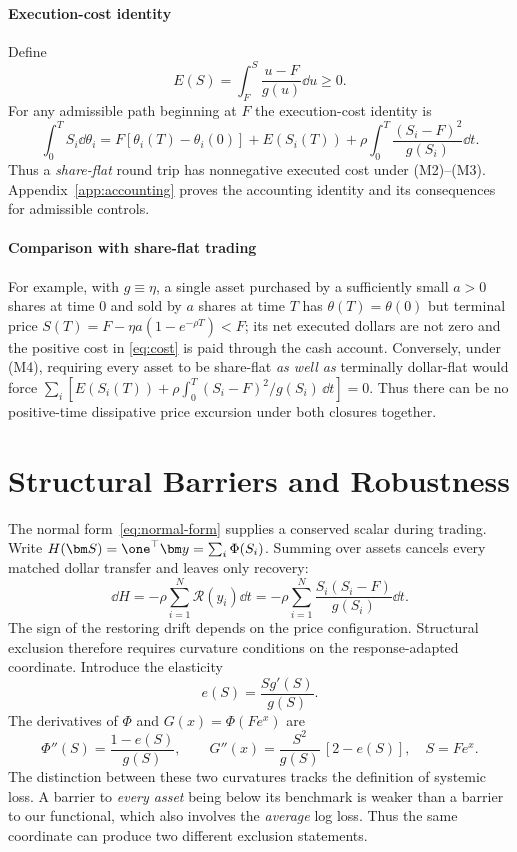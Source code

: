 \documentclass[review,hidelinks,onefignum,onetabnum]{siamonline250211}
\begin{document}
\paragraph{Execution-cost identity} Define
\begin{equation}\label{eq:E}
E(S)=\int_F^S\frac{u-F}{g(u)}\dd u\ge0.
\end{equation}
For any admissible path beginning at $F$ the execution-cost identity is
\begin{equation}\label{eq:cost}
\int_0^T S_i\dd\theta_i=F[\theta_i(T)-\theta_i(0)]+E(S_i(T))
+\rho\int_0^T\frac{(S_i-F)^2}{g(S_i)}\dd t.
\end{equation}
Thus a \emph{share-flat} round trip has nonnegative executed cost under (M2)--(M3). Appendix~\ref{app:accounting} proves the accounting identity and its consequences for admissible controls.

\paragraph{Comparison with share-flat trading}
For example, with $g\equiv\eta$, a single asset purchased by a sufficiently small $a>0$ shares at time $0$ and sold by $a$ shares at time $T$ has $\theta(T)=\theta(0)$ but terminal price $S(T)=F-\eta a(1-e^{-\rho T})<F$; its net executed dollars are not zero and the positive cost in \eqref{eq:cost} is paid through the cash account. Conversely, under (M4), requiring every asset to be share-flat \emph{as well as} terminally dollar-flat would force $\sum_i[E(S_i(T))+\rho\int_0^T(S_i-F)^2/g(S_i)\,\dd t]=0$. Thus there can be no positive-time dissipative price excursion under both closures together.

\section{Structural Barriers and Robustness}\label{sec:barriers}
The normal form~\eqref{eq:normal-form} supplies a conserved scalar during trading. Write $H(\bm S)=\one^\top\bm y=\sum_i\Phi(S_i)$. Summing over assets cancels every matched dollar transfer and leaves only recovery:
\begin{equation}\label{eq:potential-law}
\dd H=-\rho\sum_{i=1}^N\mathcal R(y_i)\dd t
=-\rho\sum_{i=1}^N\frac{S_i(S_i-F)}{g(S_i)}\dd t.
\end{equation}
The sign of the restoring drift depends on the price configuration.
Structural exclusion therefore requires curvature conditions on the
response-adapted coordinate. Introduce the elasticity
\begin{equation}\label{eq:elasticity}
e(S)=\frac{Sg'(S)}{g(S)}.
\end{equation}
The derivatives of $\Phi$ and $G(x)=\Phi(Fe^x)$ are
\begin{equation}\label{eq:curvature}
\Phi''(S)=\frac{1-e(S)}{g(S)},\qquad
G''(x)=\frac{S^2}{g(S)}\,[2-e(S)],\quad S=Fe^x.
\end{equation}
The distinction between these two curvatures tracks the definition of systemic loss. A barrier to \emph{every asset} being below its benchmark is weaker than a barrier to our functional, which also involves the \emph{average} log loss. Thus the same coordinate can produce two different exclusion statements.
\end{document}
